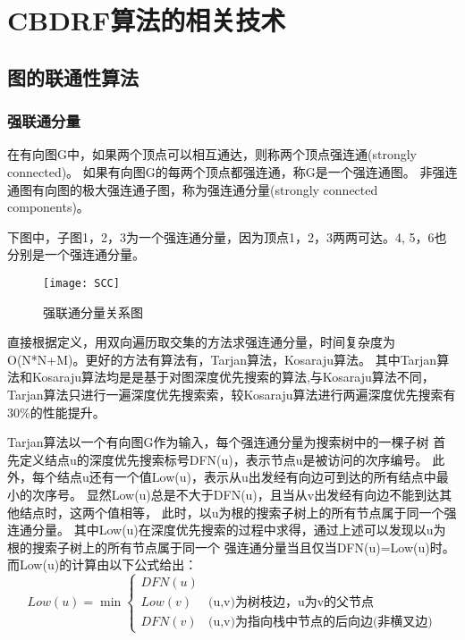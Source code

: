 \chapter{CBDRF算法的相关技术}
\label{chap:outline}
\section{图的联通性算法}
\subsection{强联通分量}
在有向图G中，如果两个顶点可以相互通达，则称两个顶点强连通(strongly connected)。
如果有向图G的每两个顶点都强连通，称G是一个强连通图。
非强连通图有向图的极大强连通子图，称为强连通分量(strongly connected components)。

下图中，子图{1，2，3}为一个强连通分量，因为顶点1，2，3两两可达。{4, 5，6}也分别是一个强连通分量。
\begin{figure}[htbp]
\centering\texttt{[image: SCC]}
\caption{强联通分量关系图}\label{fig:SCC}
\end{figure}
直接根据定义，用双向遍历取交集的方法求强连通分量，时间复杂度为O(N*N+M)。更好的方法有算法有，Tarjan算法，Kosaraju算法。
其中Tarjan算法和Kosaraju算法均是是基于对图深度优先搜索的算法,与Kosaraju算法不同，
Tarjan算法只进行一遍深度优先搜索索，较Kosaraju算法进行两遍深度优先搜索有30\%的性能提升。

Tarjan算法以一个有向图G作为输入，每个强连通分量为搜索树中的一棵子树
首先定义结点u的深度优先搜索标号DFN(u)，表示节点u是被访问的次序编号。
此外，每个结点u还有一个值Low(u)，表示从u出发经有向边可到达的所有结点中最小的次序号。
显然Low(u)总是不大于DFN(u)，且当从v出发经有向边不能到达其他结点时，这两个值相等，
此时，以u为根的搜索子树上的所有节点属于同一个强连通分量。
其中Low(u)在深度优先搜索的过程中求得，通过上述可以发现以u为根的搜索子树上的所有节点属于同一个
强连通分量当且仅当DFN(u)=Low(u)时。而Low(u)的计算由以下公式给出：
$$Low(u)=\min
\begin{cases}
DFN(u) & \\
Low(v)& \text{(u,v)为树枝边，u为v的父节点}\\
DFN(v)& \text{(u,v)为指向栈中节点的后向边(非横叉边)}
\end{cases}$$

